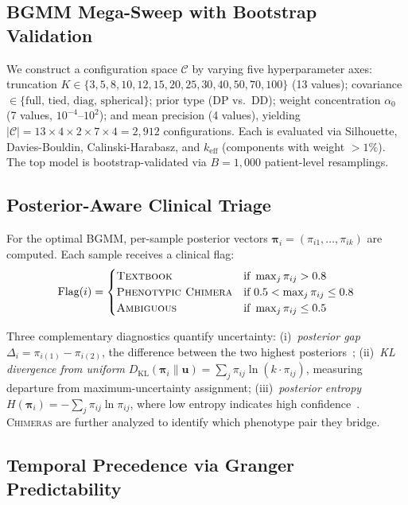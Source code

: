 \documentclass[runningheads]{llncs}
\begin{document}
\subsection{BGMM Mega-Sweep with Bootstrap Validation}

We construct a configuration space $\mathcal{C}$ by varying five hyperparameter axes: truncation $K \in \{3,5,8,10,12,15,20,25,30,40,50,70,100\}$ (13 values); covariance $\in \{\text{full, tied, diag, spherical}\}$; prior type (DP vs.\ DD); weight concentration $\alpha_0$ (7 values, $10^{-4}$--$10^{2}$); and mean precision (4 values), yielding $|\mathcal{C}| = 13{\times}4{\times}2{\times}7{\times}4 = 2{,}912$ configurations. Each is evaluated via Silhouette, Davies-Bouldin, Calinski-Harabasz, and $k_{\mathrm{eff}}$ (components with weight ${>}1\%$). The top model is bootstrap-validated via $B{=}1{,}000$ patient-level resamplings.

\subsection{Posterior-Aware Clinical Triage}

For the optimal BGMM, per-sample posterior vectors $\boldsymbol{\pi}_i = (\pi_{i1}, \ldots, \pi_{ik})$ are computed. Each sample receives a clinical flag:
\begin{equation}
\text{Flag}(i) = \begin{cases}
\textsc{Textbook} & \text{if } \max_j \pi_{ij} > 0.8 \\
\textsc{Phenotypic Chimera} & \text{if } 0.5 < \max_j \pi_{ij} \leq 0.8 \\
\textsc{Ambiguous} & \text{if } \max_j \pi_{ij} \leq 0.5
\end{cases}
\label{eq:flagging}
\end{equation}

Three complementary diagnostics quantify uncertainty: (i)~\emph{posterior gap} $\Delta_i = \pi_{i(1)} - \pi_{i(2)}$, the difference between the two highest posteriors~\cite{bishop2006pattern}; (ii)~\emph{KL divergence from uniform} $D_{\text{KL}}(\boldsymbol{\pi}_i \| \mathbf{u}) = \sum_j \pi_{ij} \ln(k \cdot \pi_{ij})$, measuring departure from maximum-uncertainty assignment; (iii)~\emph{posterior entropy} $H(\boldsymbol{\pi}_i) = -\sum_j \pi_{ij} \ln \pi_{ij}$, where low entropy indicates high confidence~\cite{shannon1948mathematical}. \textsc{Chimeras} are further analyzed to identify which phenotype pair they bridge.

\subsection{Temporal Precedence via Granger Predictability}
\end{document}
